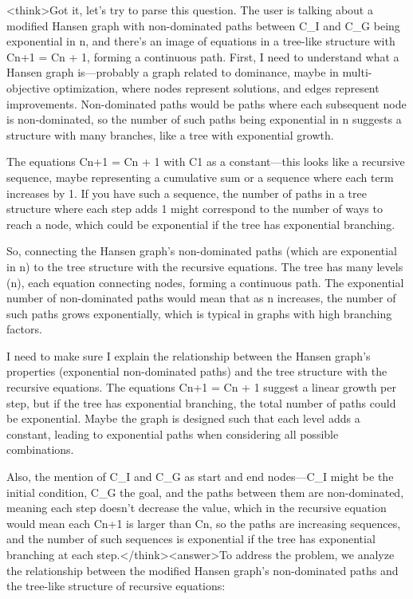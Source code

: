 <think>Got it, let's try to parse this question. The user is talking about a modified Hansen graph with non-dominated paths between C_I and C_G being exponential in n, and there's an image of equations in a tree-like structure with Cn+1 = Cn + 1, forming a continuous path. First, I need to understand what a Hansen graph is—probably a graph related to dominance, maybe in multi-objective optimization, where nodes represent solutions, and edges represent improvements. Non-dominated paths would be paths where each subsequent node is non-dominated, so the number of such paths being exponential in n suggests a structure with many branches, like a tree with exponential growth.

The equations Cn+1 = Cn + 1 with C1 as a constant—this looks like a recursive sequence, maybe representing a cumulative sum or a sequence where each term increases by 1. If you have such a sequence, the number of paths in a tree structure where each step adds 1 might correspond to the number of ways to reach a node, which could be exponential if the tree has exponential branching. 

So, connecting the Hansen graph's non-dominated paths (which are exponential in n) to the tree structure with the recursive equations. The tree has many levels (n), each equation connecting nodes, forming a continuous path. The exponential number of non-dominated paths would mean that as n increases, the number of such paths grows exponentially, which is typical in graphs with high branching factors.

I need to make sure I explain the relationship between the Hansen graph's properties (exponential non-dominated paths) and the tree structure with the recursive equations. The equations Cn+1 = Cn + 1 suggest a linear growth per step, but if the tree has exponential branching, the total number of paths could be exponential. Maybe the graph is designed such that each level adds a constant, leading to exponential paths when considering all possible combinations.

Also, the mention of C_I and C_G as start and end nodes—C_I might be the initial condition, C_G the goal, and the paths between them are non-dominated, meaning each step doesn't decrease the value, which in the recursive equation would mean each Cn+1 is larger than Cn, so the paths are increasing sequences, and the number of such sequences is exponential if the tree has exponential branching at each step.</think><answer>To address the problem, we analyze the relationship between the modified Hansen graph’s non-dominated paths and the tree-like structure of recursive equations:  

